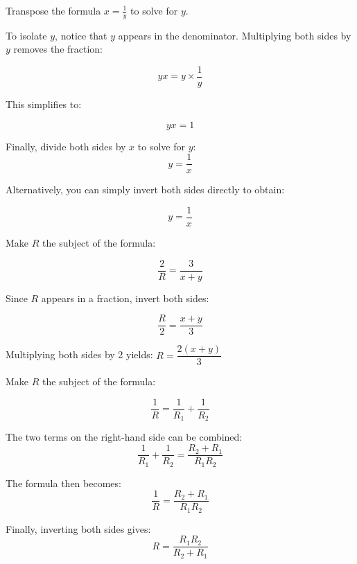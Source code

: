\begin{example} Transpose the formula \(x = \frac{1}{y}\) to solve for \(y\).

\begin{solution}
To isolate \(y\), notice that \(y\) appears in the denominator. Multiplying both sides by \(y\) removes the fraction:

\[
yx = y \times \frac{1}{y}
\]

This simplifies to:

\[
yx = 1
\]

Finally, divide both sides by \(x\) to solve for \(y\):
\[
y = \frac{1}{x}
\]

Alternatively, you can simply invert both sides directly to obtain:

\[
y = \frac{1}{x}
\]    
\end{solution}


\end{example}


\begin{example} Make \(R\) the subject of the formula:

\[
\frac{2}{R} = \frac{3}{x + y}
\]

\begin{solution} Since \(R\) appears in a fraction, invert both sides:

\[
\frac{R}{2} = \frac{x + y}{3}
\]

Multiplying both sides by 2 yields: $R = \dfrac{2(x + y)}{3}$    
\end{solution}
    
\end{example} 

\begin{example} Make \(R\) the subject of the formula:

\[
\frac{1}{R} = \frac{1}{R_1} + \frac{1}{R_2}
\]
\begin{solution}
The two terms on the right-hand side can be combined:
\[
\frac{1}{R_1} + \frac{1}{R_2} = \frac{R_2 + R_1}{R_1R_2}
\]

The formula then becomes:
\[
\frac{1}{R} = \frac{R_2 + R_1}{R_1R_2}
\]

Finally, inverting both sides gives:
\[
R = \frac{R_1R_2}{R_2 + R_1}
\]

\end{solution}
\end{example}

